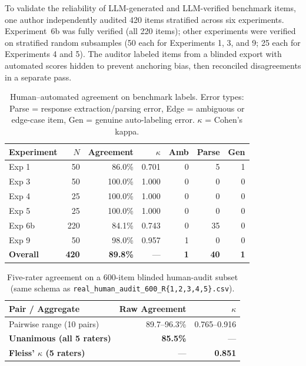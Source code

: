 \documentclass[10pt]{article}
\begin{document}
To validate the reliability of LLM-generated and LLM-verified benchmark items,
one author independently audited 420 items stratified across six experiments.
Experiment~6b was fully verified (all 220 items); other experiments were verified
on stratified random subsamples (50 each for Experiments 1, 3, and 9; 25 each for
Experiments 4 and 5). The auditor labeled items from a blinded export with
automated scores hidden to prevent anchoring bias, then reconciled disagreements
in a separate pass.

\begin{table}[h]
\centering
\caption{Human--automated agreement on benchmark labels. Error types:
  Parse = response extraction/parsing error, Edge = ambiguous or edge-case item,
  Gen = genuine auto-labeling error. $\kappa$ = Cohen's kappa.}
\label{tab:human-audit}
\small
\begin{tabular}{lrrrrrr}
\toprule
Experiment & $N$ & Agreement & $\kappa$ & Amb & Parse & Gen \\
\midrule
Exp 1 & 50 & 86.0\% & 0.701 & 0 & 5 & 1 \\
Exp 3 & 50 & 100.0\% & 1.000 & 0 & 0 & 0 \\
Exp 4 & 25 & 100.0\% & 1.000 & 0 & 0 & 0 \\
Exp 5 & 25 & 100.0\% & 1.000 & 0 & 0 & 0 \\
Exp 6b & 220 & 84.1\% & 0.743 & 0 & 35 & 0 \\
Exp 9 & 50 & 98.0\% & 0.957 & 1 & 0 & 0 \\
\midrule
\textbf{Overall} & \textbf{420} & \textbf{89.8\%} & --- & \textbf{1} & \textbf{40} & \textbf{1} \\
\bottomrule
\end{tabular}
\end{table}

\begin{table}[h]
\centering
\caption{Five-rater agreement on a 600-item blinded human-audit subset
  (same schema as \texttt{real\_human\_audit\_600\_R\{1,2,3,4,5\}.csv}).}
\label{tab:human-audit-multirater}
\small
\begin{tabular}{lrr}
\toprule
Pair / Aggregate & Raw Agreement & $\kappa$ \\
\midrule
Pairwise range (10 pairs) & 89.7--96.3\% & 0.765--0.916 \\
\midrule
\textbf{Unanimous (all 5 raters)} & \textbf{85.5\%} & --- \\
\textbf{Fleiss' $\kappa$ (5 raters)} & --- & \textbf{0.851} \\
\bottomrule
\end{tabular}
\end{table}
\end{document}
